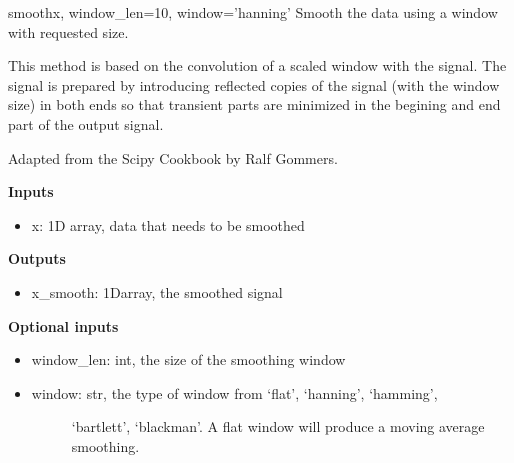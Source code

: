 \documentclass[letterpaper,10pt,english]{manual}
\begin{document}
\hypertarget{imageprocess.smooth}{}\begin{funcdesc}{smooth}{x, window\_len=10, window='hanning'}
Smooth the data using a window with requested size.

This method is based on the convolution of a scaled window with the signal.
The signal is prepared by introducing reflected copies of the signal
(with the window size) in both ends so that transient parts are minimized
in the begining and end part of the output signal.

Adapted from the Scipy Cookbook by Ralf Gommers.

\textbf{Inputs}
\begin{itemize}
\item {} 
x: 1D array, data that needs to be smoothed

\end{itemize}

\textbf{Outputs}
\begin{itemize}
\item {} 
x\_smooth: 1Darray, the smoothed signal

\end{itemize}

\textbf{Optional inputs}
\begin{itemize}
\item {} 
window\_len: int, the size of the smoothing window

\item {} \begin{description}
\item[window: str, the type of window from `flat', `hanning', `hamming',]
`bartlett', `blackman'. A flat window will produce a
moving average smoothing.

\end{description}

\end{itemize}
\end{funcdesc}
\end{document}
